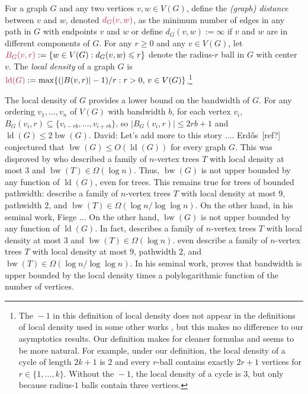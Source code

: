 \documentclass{patmorin}
\makeatletter
\renewcommand{\ge}{\geqslant}
\renewcommand{\le}{\leqslant}
\renewcommand{\leq}{\leqslant}
\newcommand{\david}[1]{{\color{orange} David: #1}}
\newcommand{\defin}[1]{\emph{\textcolor{brightmaroon}{#1}}}
\def\mathcolor#1#{\@mathcolor{#1}}
\def\@mathcolor#1#2#3{%
  \protect\leavevmode
  \begingroup
    \color#1{#2}#3%
  \endgroup
}
\newcommand{\mathdefin}[1]{\mathcolor{brightmaroon}{#1}}
\DeclareMathOperator{\bw}{bw}
\DeclareMathOperator{\ld}{ld}
\makeatother
\begin{document}
For a graph $G$ and any two vertices $v,w\in V(G)$, define the \defin{(graph) distance} between $v$ and $w$, denoted $\mathdefin{d_G(v,w)}$, as the minimum number of edges in any path in $G$ with endpoints $v$ and $w$ or define $d_G(v,w):=\infty$ if $v$ and $w$ are in different components of $G$.  For any $r\ge 0$ and any $v\in V(G)$, let $\mathdefin{B_G(v,r)}:=\{w\in V(G):d_G(v,w)\le r\}$ denote the radius-$r$ ball in $G$ with center $v$.
The \defin{local density} of a graph $G$ is $\mathdefin{\ld(G)}:=\max\{(|B(v,r)|-1)/r:r> 0,\, v\in V(G)\}$.\footnote{The ${}-1$ in this definition of local density does not appear in the definitions of local density used in some other works \cite{feige:approximating,rao:small}, but this makes no difference to our asymptotics results.  Our definition makes for cleaner formulas and seems to be more natural. For example, under our definition, the local density of a cycle of length $2k+1$ is $2$ and every $r$-ball contains exactly $2r+1$ vertices for $r\in\{1,\ldots,k\}$. Without the ${}-1$, the local density of a cycle is $3$, but only because radius-$1$ balls contain three vertices.}



The local density of $G$ provides a lower bound on the bandwidth of $G$. For any ordering $v_1,\dots,v_n$ of $V(G)$ with bandwidth $b$, for each vertex $v_i$, $B_G(v_i,r) \subseteq \{v_{i-rb},\dots,v_{i+rb}\}$, so $|B_G(v_i,r)|\leq 2rb+1$ and $\ld(G)\leq 2\bw(G)$. \david{Let's add more to this story .... Erd\H{o}s~[ref?] conjectured that $\bw(G)\leq O(\ld(G))$ for every graph $G$. This was disproved by \citet{chvatalova:on} who described a family of $n$-vertex trees $T$ with local density at most $3$ and $\bw(T)\in\Omega(\log n)$. Thus, $\bw(G)$ is not upper bounded by any function of $\ld(G)$, even for trees. This remains true for trees of bounded pathwidth: \citet{CS89} describe a family of $n$-vertex trees $T$ with local density at most $9$, pathwidth $2$, and  $\bw(T)\in\Omega(\log n/\log\log n)$. On the other hand, in his seminal work, Fiege ...} 
On the other hand, $\bw(G)$ is not upper bounded by any function of $\ld(G)$. In fact, \citet{chvatalova:on} describes a family of $n$-vertex trees $T$ with local density at most $3$ and $\bw(T)\in\Omega(\log n)$.  \citet{CS89} even describe a family of $n$-vertex trees $T$ with local density at most $9$, pathwidth $2$, and  $\bw(T)\in\Omega(\log n/\log\log n)$.  In his seminal work, \citet{feige:approximating} proves that bandwidth is upper bounded by the local density times a polylogarithmic function of the number of vertices.
\end{document}
